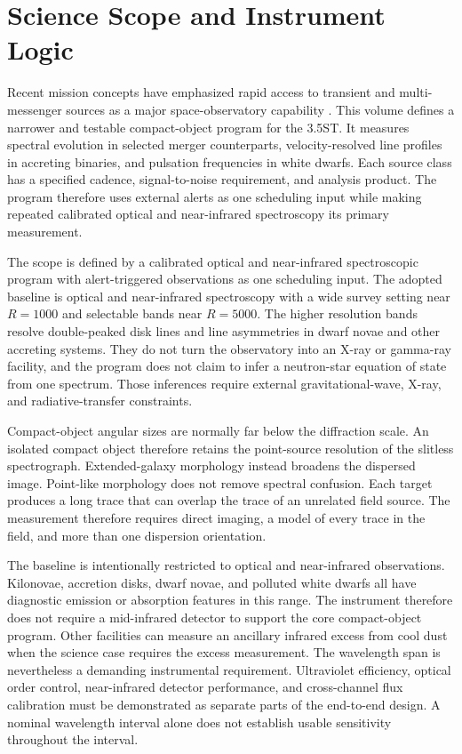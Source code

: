 \documentclass[10pt,onecolumn]{article}
\begin{document}
\section{Science Scope and Instrument Logic}

Recent mission concepts have emphasized rapid access to transient and
multi-messenger sources as a major space-observatory capability
\cite{roy2026D,wevers2026D}. This volume defines a narrower and testable
compact-object program for the 3.5ST. It measures spectral evolution in
selected merger counterparts, velocity-resolved line profiles in accreting
binaries, and pulsation frequencies in white dwarfs. Each source class has a
specified cadence, signal-to-noise requirement, and analysis product. The
program therefore uses external alerts as one scheduling input while making
repeated calibrated optical and near-infrared spectroscopy its primary
measurement.

The scope is defined by a calibrated optical and near-infrared spectroscopic
program with alert-triggered observations as one scheduling input.
The adopted baseline is optical and near-infrared spectroscopy with a wide
survey setting near $R=1000$ and selectable bands near $R=5000$. The higher
resolution bands resolve double-peaked disk lines and line asymmetries in
dwarf novae and other accreting systems. They do not turn the observatory
into an X-ray or gamma-ray facility, and the program does not claim to infer
a neutron-star equation of state from one spectrum. Those inferences require
external gravitational-wave, X-ray, and radiative-transfer constraints.

Compact-object angular sizes are normally far below the diffraction scale.
An isolated compact object therefore retains the point-source resolution of
the slitless spectrograph. Extended-galaxy morphology instead broadens the
dispersed image. Point-like morphology does not remove spectral confusion.
Each target produces a long trace that can overlap the trace of an unrelated
field source. The measurement therefore requires direct imaging, a model of
every trace in the field, and more than one dispersion orientation.

The baseline is intentionally restricted to optical and near-infrared
observations. Kilonovae, accretion disks, dwarf novae, and polluted white
dwarfs all have diagnostic emission or absorption features in this range.
The instrument therefore does not require a mid-infrared detector to support
the core compact-object program. Other facilities can measure an ancillary
infrared excess from cool dust when the science case requires the excess
measurement.
The wavelength span is nevertheless a demanding instrumental requirement.
Ultraviolet efficiency, optical order control, near-infrared detector
performance, and cross-channel flux calibration must be demonstrated as
separate parts of the end-to-end design. A nominal wavelength interval alone
does not establish usable sensitivity throughout the interval.
\end{document}
